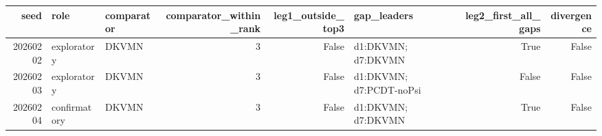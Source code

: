 \begin{tabular}{rllrrlrr}
\toprule
seed & role & comparator & comparator\_within\_rank & leg1\_outside\_top3 & gap\_leaders & leg2\_first\_all\_gaps & divergence \\
\midrule
20260202 & exploratory & DKVMN & 3 & False & d1:DKVMN; d7:DKVMN & True & False \\
20260203 & exploratory & DKVMN & 3 & False & d1:DKVMN; d7:PCDT-noPsi & False & False \\
20260204 & confirmatory & DKVMN & 3 & False & d1:DKVMN; d7:DKVMN & True & False \\
\bottomrule
\end{tabular}
